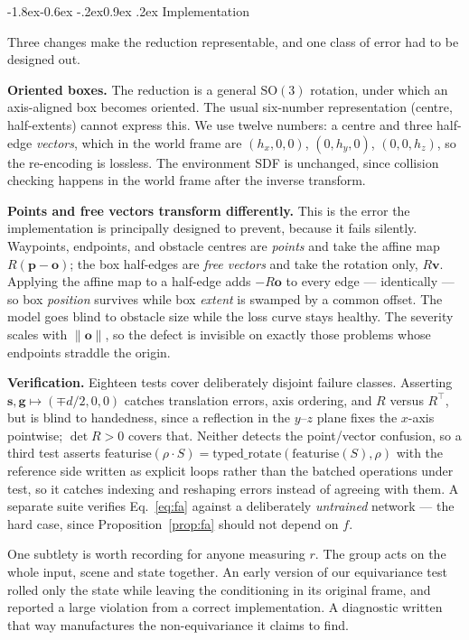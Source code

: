 \documentclass[10pt,twocolumn,letterpaper]{article}
\makeatletter
\renewcommand\subsection{\@startsection{subsection}{2}{\z@}%
  {-1.8ex\@plus -0.6ex \@minus -.2ex}{0.9ex \@plus .2ex}%
  {\normalfont\normalsize\bfseries}}
\theoremstyle{plain}
\newcommand{\svec}{\mathbf{s}}
\newcommand{\gvec}{\mathbf{g}}
\newcommand{\SOth}{\mathrm{SO}(3)}
\makeatother
\begin{document}
\subsection{Implementation}
\label{sec:impl}

Three changes make the reduction representable, and one class of error had to be
designed out.

\textbf{Oriented boxes.} The reduction is a general $\SOth$ rotation, under which
an axis-aligned box becomes oriented. The usual six-number representation (centre,
half-extents) cannot express this. We use twelve numbers: a centre and three
half-edge \emph{vectors}, which in the world frame are $(h_x,0,0)$, $(0,h_y,0)$,
$(0,0,h_z)$, so the re-encoding is lossless. The environment SDF is unchanged,
since collision checking happens in the world frame after the inverse transform.

\textbf{Points and free vectors transform differently.} This is the error the
implementation is principally designed to prevent, because it fails silently.
Waypoints, endpoints, and obstacle centres are \emph{points} and take the affine
map $R(\mathbf{p}-\mathbf{o})$; the box half-edges are \emph{free vectors} and take
the rotation only, $R\mathbf{v}$. Applying the affine map to a half-edge adds
$-R\mathbf{o}$ to every edge --- identically --- so box \emph{position} survives
while box \emph{extent} is swamped by a common offset. The model goes blind to
obstacle size while the loss curve stays healthy. The severity scales with
$\|\mathbf{o}\|$, so the defect is invisible on exactly those problems whose
endpoints straddle the origin.

\textbf{Verification.} Eighteen tests cover deliberately disjoint failure classes.
Asserting $\svec,\gvec\mapsto(\mp d/2,0,0)$ catches translation errors, axis
ordering, and $R$ versus $R^\top$, but is blind to handedness, since a reflection
in the $y$--$z$ plane fixes the $x$-axis pointwise; $\det R>0$ covers that. Neither
detects the point/vector confusion, so a third test asserts
$\mathrm{featurise}(\rho\cdot S)=\mathrm{typed\_rotate}(\mathrm{featurise}(S),\rho)$
with the reference side written as explicit loops rather than the batched
operations under test, so it catches indexing and reshaping errors instead of
agreeing with them. A separate suite verifies Eq.~\eqref{eq:fa} against a
deliberately \emph{untrained} network --- the hard case, since
Proposition~\ref{prop:fa} should not depend on $f$.

One subtlety is worth recording for anyone measuring $r$. The group acts on the
whole input, scene and state together. An early version of our equivariance test
rolled only the state while leaving the conditioning in its original frame, and
reported a large violation from a correct implementation. A diagnostic written
that way manufactures the non-equivariance it claims to find.
\end{document}
